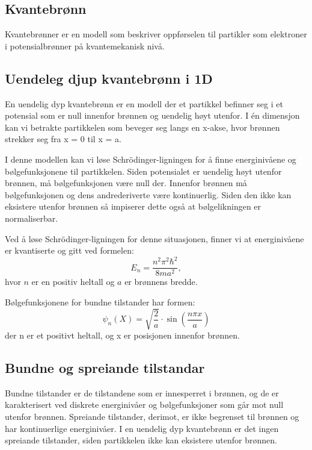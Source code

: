 \homeworkProblem[2]

\subsection*{Kvantebrønn}

Kvantebrønner er en modell som beskriver oppførselen til partikler som elektroner i potensialbrønner på kvantemekanisk nivå.

\subsection*{Uendeleg djup kvantebrønn i 1D}
En uendelig dyp kvantebrønn er en modell der et partikkel befinner seg i et potensial som er null innenfor brønnen og uendelig høyt utenfor. I én dimensjon kan vi betrakte partikkelen som beveger seg langs en x-akse, hvor brønnen strekker seg fra x = 0 til x = a.

I denne modellen kan vi løse Schrödinger-ligningen for å finne energinivåene og bølgefunksjonene til partikkelen. Siden potensialet er uendelig høyt utenfor brønnen, må bølgefunksjonen være null der. Innenfor brønnen må bølgefunksjonen og dens andrederiverte være kontinuerlig. Siden den ikke kan eksistere utenfor brønnen så impiserer dette også at bølgelikningen er normaliserbar.

Ved å løse Schrödinger-ligningen for denne situasjonen, finner vi at energinivåene er kvantiserte og gitt ved formelen:
\begin{equation*}
E_n = \frac{n^2\pi^2\hbar^2}{8ma^2},
\end{equation*}
hvor $n$ er en positiv heltall og $a$ er brønnens bredde.

Bølgefunksjonene for bundne tilstander har formen:
\begin{equation*}
    \psi_n(X)=\sqrt{\frac{2}{a}}\cdot \sin (\frac{n \pi x}{a})
\end{equation*}
der n er et positivt heltall, og x er posisjonen innenfor brønnen.

\subsection*{Bundne og spreiande tilstandar}
Bundne tilstander er de tilstandene som er innesperret i brønnen, og de er karakterisert ved diskrete energinivåer og bølgefunksjoner som går mot null utenfor brønnen. Spreiande tilstander, derimot, er ikke begrenset til brønnen og har kontinuerlige energinivåer. I en uendelig dyp kvantebrønn er det ingen spreiande tilstander, siden partikkelen ikke kan eksistere utenfor brønnen.

